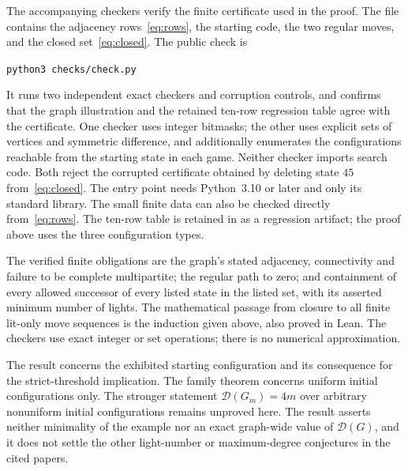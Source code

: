 \documentclass[11pt]{article}
\begin{document}
The accompanying checkers verify the finite certificate used in the
proof. The file  contains the adjacency
rows~\eqref{eq:rows}, the starting code, the two regular moves, and the
closed set~\eqref{eq:closed}. The public check is
\begin{center}
\texttt{python3 checks/check.py}
\end{center}
It runs two independent exact checkers and corruption controls, and
confirms that the graph illustration and the retained ten-row
regression table agree with the certificate. One checker uses integer bitmasks; the other uses explicit
sets of vertices and symmetric difference, and additionally enumerates
the configurations reachable from the starting state in each game.
Neither checker imports search code. Both reject the corrupted
certificate obtained by deleting state $45$ from~\eqref{eq:closed}.
The entry point needs Python~3.10 or later and only its standard library.
The small finite data
can also be checked directly from~\eqref{eq:rows}. The ten-row table
is retained in  as a regression artifact;
the proof above uses the three configuration types.

The verified finite obligations are the graph's stated adjacency,
connectivity and failure to be complete multipartite; the regular path
to zero; and containment of every allowed successor of every listed
state in the listed set, with its asserted minimum number of lights.
The mathematical passage from closure to all finite lit-only move
sequences is the induction given above, also proved in Lean. The checkers
use exact integer or set operations; there is no numerical approximation.

The result concerns the exhibited starting configuration and its
consequence for the strict-threshold implication. The family theorem concerns uniform initial configurations only. The
stronger statement $\mathcal D(G_m)=4m$ over arbitrary nonuniform
initial configurations remains unproved here. The result asserts neither
minimality of the example nor an exact graph-wide value of
$\mathcal D(G)$, and it does not settle the other light-number or
maximum-degree conjectures in the cited papers.
\end{document}
